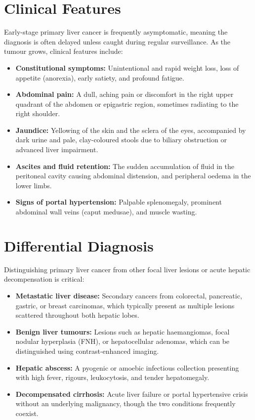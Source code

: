 \section*{Clinical Features}
Early-stage primary liver cancer is frequently asymptomatic, meaning the diagnosis is often delayed unless caught during regular surveillance. As the tumour grows, clinical features include:
\begin{itemize}
    \item \textbf{Constitutional symptoms:} Unintentional and rapid weight loss, loss of appetite (anorexia), early satiety, and profound fatigue.
    \item \textbf{Abdominal pain:} A dull, aching pain or discomfort in the right upper quadrant of the abdomen or epigastric region, sometimes radiating to the right shoulder.
    \item \textbf{Jaundice:} Yellowing of the skin and the sclera of the eyes, accompanied by dark urine and pale, clay-coloured stools due to biliary obstruction or advanced liver impairment.
    \item \textbf{Ascites and fluid retention:} The sudden accumulation of fluid in the peritoneal cavity causing abdominal distension, and peripheral oedema in the lower limbs.
    \item \textbf{Signs of portal hypertension:} Palpable splenomegaly, prominent abdominal wall veins (caput medusae), and muscle wasting.
\end{itemize}

\section*{Differential Diagnosis}
Distinguishing primary liver cancer from other focal liver lesions or acute hepatic decompensation is critical:
\begin{itemize}
    \item \textbf{Metastatic liver disease:} Secondary cancers from colorectal, pancreatic, gastric, or breast carcinomas, which typically present as multiple lesions scattered throughout both hepatic lobes.
    \item \textbf{Benign liver tumours:} Lesions such as hepatic haemangiomas, focal nodular hyperplasia (FNH), or hepatocellular adenomas, which can be distinguished using contrast-enhanced imaging.
    \item \textbf{Hepatic abscess:} A pyogenic or amoebic infectious collection presenting with high fever, rigours, leukocytosis, and tender hepatomegaly.
    \item \textbf{Decompensated cirrhosis:} Acute liver failure or portal hypertensive crisis without an underlying malignancy, though the two conditions frequently coexist.
\end{itemize}

